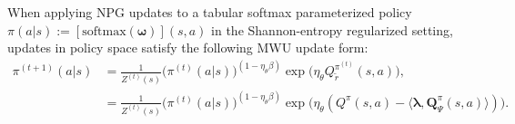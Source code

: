 \begin{lemma}
    \label{lem:MWU_Step}
    When applying NPG updates to a tabular softmax parameterized policy $\pi(a|s) := [\text{softmax}(\bm{\omega})](s,a)$ in the Shannon-entropy regularized setting, updates in policy space satisfy the following MWU  update form:
    \begin{align*}
        \pi^{(t+1)}(a|s) 
        &= \frac{1}{Z^{(t)}(s)}\big(\pi^{(t)}(a|s)\big)^{(1-\eta_\theta \beta)} \exp\bigl( \eta_\theta Q_{\tilde{r}}^{\pi^{(t)}} (s,a)  \bigr), \\
        &= \frac{1}{Z^{(t)}(s)}\big(\pi^{(t)}(a|s)\big)^{(1-\eta_\theta \beta)} \exp\bigl( \eta_\theta(Q^\pi(s,a) - \langle \bm{\lambda}, \bm{Q}_\Psi^\pi(s,a) \rangle )  \bigr).
    \end{align*}
\end{lemma}
